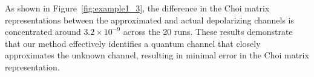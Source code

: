 \documentclass[onefignum,onetabnum]{siamart220329}
\begin{document}
{As shown in Figure~\ref{fig:example1_3}, the difference in the Choi matrix representations between the approximated and actual depolarizing channels is concentrated around $3.2 \times 10^{-9}$ across the 20 runs. These results demonstrate that our method effectively identifies a quantum channel that closely approximates the unknown channel, resulting in minimal error in the Choi matrix representation.  


    
    
}
\end{document}
